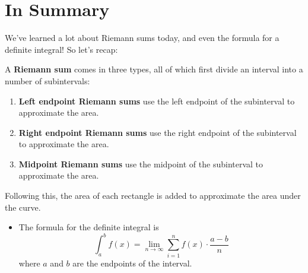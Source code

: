 \documentclass{ximera}
\begin{document}
\section{In Summary}
We've learned a lot about Riemann sums today, and even the formula for a definite integral! So let's recap:
\begin{definition}
A \textbf{Riemann sum} comes in three types, all of which first divide an interval into a number of subintervals:
\begin{enumerate}
\item{\textbf{Left endpoint Riemann sums} use the left endpoint of the subinterval to approximate the area.}
\item{\textbf{Right endpoint Riemann sums} use the right endpoint of the subinterval to approximate the area.}
\item{\textbf{Midpoint Riemann sums} use the midpoint of the subinterval to approximate the area.}
\end{enumerate}
Following this, the area of each rectangle is added to approximate the area under the curve.
\end{definition}

\begin{itemize}
\item{The formula for the definite integral is $$\displaystyle \int_a^b f(x) = \lim_{n\to\infty} \sum_{i=1}^n f(x) \cdot \frac{a-b}{n}$$where $a$ and $b$ are the endpoints of the interval.}
\end{itemize}
\pagebreak
\end{document}
